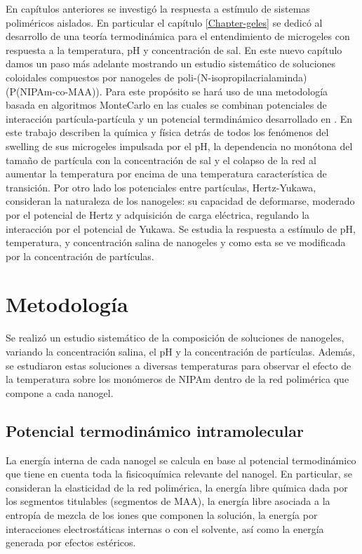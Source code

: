 	En cap\'itulos anteriores se investig\'o la respuesta a est\'imulo de sistemas polim\'ericos aislados. En particular el cap\'itulo \ref{Chapter-geles} se dedic\'o al desarrollo de una teor\'ia termodin\'amica para el entendimiento de microgeles con respuesta a la temperatura, pH y concentraci\'on de sal. 
	En este nuevo cap\'itulo damos un paso m\'as adelante mostrando un estudio sistem\'atico de soluciones coloidales compuestos por nanogeles de poli-(N-isopropilacrialaminda) (P(NIPAm-co-MAA)). Para este prop\'osito se har\'a uso de una metodolog\'ia basada en algoritmos MonteCarlo en las cuales se combinan potenciales de interacci\'on part\'icula-part\'icula y un potencial termdin\'amico desarrollado en \cite{perez2021thermodynamic}. En este trabajo \citet{perez2021thermodynamic} describen la qu\'imica y f\'isica detr\'as de todos los fen\'omenos del swelling de sus microgeles impulsada por el pH, la dependencia no mon\'otona del tama\~no de part\'icula con la concentraci\'on de sal y el colapso de la red al aumentar la temperatura por encima de una temperatura caracter\'istica de transici\'on.
	Por otro lado los potenciales entre part\'iculas, Hertz-Yukawa, consideran la naturaleza de los nanogeles: su capacidad de deformarse, moderado por el potencial de Hertz y adquisici\'on de carga el\'ectrica, regulando la interacci\'on por el potencial de Yukawa.
	Se estudia la respuesta a est\'imulo de pH, temperatura, y concentraci\'on salina de nanogeles y como esta se ve modificada por la concentraci\'on de part\'iculas. 

	
	
	\section{Metodolog\'ia}
	
	Se realiz\'o un estudio sistem\'atico de la composici\'on de soluciones de nanogeles, variando la concentraci\'on salina, el pH y la concentraci\'on de part\'iculas. Adem\'as, se estudiaron estas soluciones a diversas temperaturas para observar el efecto de la temperatura sobre los mon\'omeros de NIPAm dentro de la red polim\'erica que compone a cada nanogel.
	
	\subsection{Potencial termodin\'amico intramolecular}
	
	La energ\'ia interna de cada nanogel se calcula en base al potencial termodin\'amico que tiene en cuenta toda la fisicoqu\'imica relevante del nanogel. En particular, se consideran la elasticidad de la red polim\'erica, la energ\'ia libre qu\'imica dada por los segmentos titulables (segmentos de MAA), la energ\'ia libre asociada a la entrop\'ia de mezcla de los iones que componen la soluci\'on, la energ\'ia por interacciones electrost\'aticas internas o con el solvente, as\'i como la energ\'ia generada por efectos est\'ericos.
	
